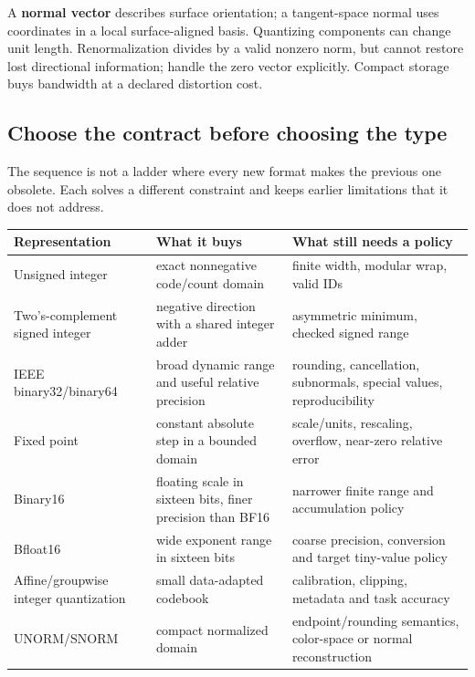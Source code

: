 A \textbf{normal vector} describes surface orientation; a tangent-space normal uses coordinates in a local surface-aligned basis. Quantizing components can change unit length. Renormalization divides by a valid nonzero norm, but cannot restore lost directional information; handle the zero vector explicitly. Compact storage buys bandwidth at a declared distortion cost.

\subsection{Choose the contract before choosing the type}\label{01-foundations-i-ch001-choose-the-contract-before-choosing-the-type}

The sequence is not a ladder where every new format makes the previous one obsolete. Each solves a different constraint and keeps earlier limitations that it does not address.

{\def\LTcaptype{none} %
\begin{longtable}[]{@{}
  >{\raggedright\arraybackslash}p{}
  >{\raggedright\arraybackslash}p{}
  >{\raggedright\arraybackslash}p{}@{}}
\toprule\noalign{}
\begin{minipage}[b]{\linewidth}\raggedright
Representation
\end{minipage} & \begin{minipage}[b]{\linewidth}\raggedright
What it buys
\end{minipage} & \begin{minipage}[b]{\linewidth}\raggedright
What still needs a policy
\end{minipage} \\
\midrule\noalign{}
\endhead
\bottomrule\noalign{}
\endlastfoot
Unsigned integer & exact nonnegative code/count domain & finite width, modular wrap, valid IDs \\
Two's-complement signed integer & negative direction with a shared integer adder & asymmetric minimum, checked signed range \\
IEEE binary32/binary64 & broad dynamic range and useful relative precision & rounding, cancellation, subnormals, special values, reproducibility \\
Fixed point & constant absolute step in a bounded domain & scale/units, rescaling, overflow, near-zero relative error \\
Binary16 & floating scale in sixteen bits, finer precision than BF16 & narrower finite range and accumulation policy \\
Bfloat16 & wide exponent range in sixteen bits & coarse precision, conversion and target tiny-value policy \\
Affine/groupwise integer quantization & small data-adapted codebook & calibration, clipping, metadata and task accuracy \\
UNORM/SNORM & compact normalized domain & endpoint/rounding semantics, color-space or normal reconstruction \\
\end{longtable}
}

